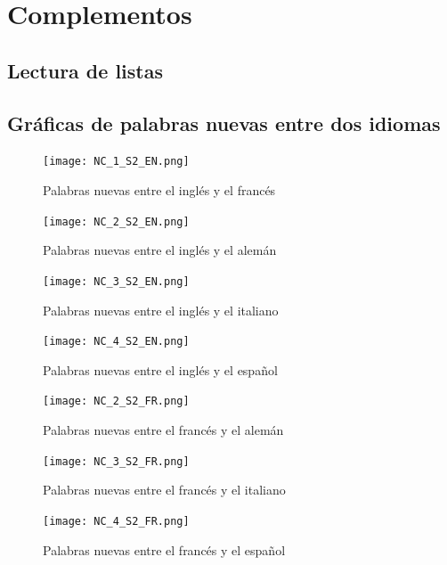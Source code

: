 \chapter{Complementos}

\section{Lectura de listas}


\newpage

\section{Gráficas de palabras nuevas entre dos idiomas}

\begin{figure}[h!]
	\centering
	\texttt{[image: NC\_1\_S2\_EN.png]}
	\label{fig.NC_EF}
	\caption{Palabras nuevas entre el inglés y el francés}
\end{figure}

\begin{figure}[h!]
	\centering
	\texttt{[image: NC\_2\_S2\_EN.png]}
	\label{fig.NC_EG}
	\caption{Palabras nuevas entre el inglés y el alemán}
\end{figure}

\begin{figure}[h!]
	\centering
	\texttt{[image: NC\_3\_S2\_EN.png]}
	\label{fig.NC_EI}
	\caption{Palabras nuevas entre el inglés y el italiano}
\end{figure}


\begin{figure}[h!]
	\centering
	\texttt{[image: NC\_4\_S2\_EN.png]}
	\label{fig.NC_ES}
	\caption{Palabras nuevas entre el inglés y el español}
\end{figure}

\begin{figure}[h!]
	\centering
	\texttt{[image: NC\_2\_S2\_FR.png]}
	\label{fig.NC_FG}
	\caption{Palabras nuevas entre el francés y el alemán}
\end{figure}


\begin{figure}[h!]
	\centering
	\texttt{[image: NC\_3\_S2\_FR.png]}
	\label{fig.NC_FI}
	\caption{Palabras nuevas entre el francés y el italiano}
\end{figure}

\begin{figure}[h!]
	\centering
	\texttt{[image: NC\_4\_S2\_FR.png]}
	\label{fig.NC_FS}
	\caption{Palabras nuevas entre el francés y el español}
\end{figure}

